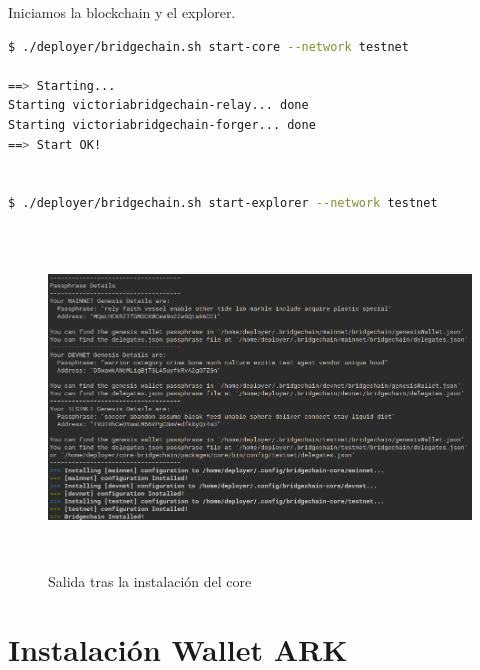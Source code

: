 Iniciamos la blockchain y el explorer.\\

\begin{lstlisting}[language=Bash,caption=Instalación Blockchain. Parte XII, label=cod:suma-cuerpo, style=Consola]
$ ./deployer/bridgechain.sh start-core --network testnet

==> Starting...
Starting victoriabridgechain-relay... done
Starting victoriabridgechain-forger... done
==> Start OK!


$ ./deployer/bridgechain.sh start-explorer --network testnet
\end{lstlisting}

\begin{figure}[h]
	\centering
	\includegraphics[width=15cm,height=9cm]{figuras/Instalacion_bridgechain.png}
	\caption{Salida tras la instalación del core}
	\label{fig:gantt-real-1}
\end{figure}

\section{Instalación Wallet ARK}





\begin{lstlisting}[language=Bash,caption=Instalación Blockchain. Parte III, label=cod:suma-cuerpo, style=Consola]

\end{lstlisting}


\begin{lstlisting}[language=Bash,caption=Instalación Blockchain. Parte III, label=cod:suma-cuerpo, style=Consola]

\end{lstlisting}

